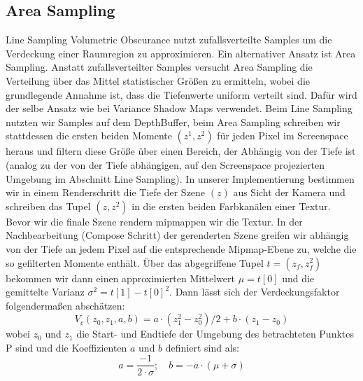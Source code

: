 \documentclass[runningheaders,a4paper]{llncs}
\begin{document}
\subsection{Area Sampling} \label{ssec:ASVO}
Line Sampling Volumetric Obscurance nutzt zufallsverteilte Samples um die Verdeckung einer
Raumregion zu approximieren. Ein alternativer Ansatz ist Area Sampling. Anstatt zufallsverteilter Samples
versucht Area Sampling die Verteilung über das Mittel statistischer Größen zu ermitteln, wobei die
 grundlegende Annahme ist, dass die Tiefenwerte uniform verteilt sind. Dafür
wird der selbe Ansatz wie bei Variance Shadow Maps \cite{vsmPaper} verwendet. Beim Line Sampling
nutzten wir Samples auf dem DepthBuffer, beim Area Sampling schreiben wir stattdessen die ersten beiden
Momente $(z^1, z^2)$ für jeden Pixel im Screenspace heraus und filtern diese Größe über einen Bereich, der
Abhängig von der Tiefe ist (analog zu der von der Tiefe abhängigen, auf den Screenspace projezierten Umgebung
im Abschnitt Line Sampling). In unserer Implementierung bestimmen wir in einem Renderschritt
die Tiefe der Szene $(z)$ aus Sicht der Kamera und schreiben das Tupel $(z, z^2)$ in die ersten beiden
Farbkanälen einer Textur. Bevor wir die finale Szene rendern mipmappen wir die Textur.
In der Nachbearbeitung (Compose Schritt) der gerenderten Szene greifen wir abhängig von der Tiefe an jedem
Pixel auf die entsprechende Mipmap-Ebene zu, welche die so gefilterten Momente enthält.
Über das abgegriffene Tupel $t = (z_f, z_f^2)$ bekommen wir dann einen approximierten Mittelwert 
$\mu = t[0]$ und die gemittelte Varianz $\sigma^2 = t[1] - t[0]^2$. Dann lässt sich der Verdeckungsfaktor 
folgendermaßen abschätzen:
$$
V_c(z_0, z_1, a, b) = a\cdot(z_1^2 - z_0^2) / 2 + b \cdot (z_1 - z_0)
$$
wobei $z_0$ und $z_1$ die Start- und Endtiefe der Umgebung des betrachteten Punktes P sind und die 
Koeffizienten $a$ und $b$ definiert sind als:
$$
a = \frac{-1}{2 \cdot \sigma}; \quad b = -a \cdot (\mu + \sigma)
$$
\end{document}
